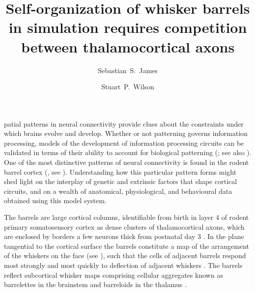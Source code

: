 \documentclass[9pt,twocolumn,twoside,lineno]{pnas-new}
\title{Self-organization of whisker barrels in simulation requires competition between thalamocortical axons}
\author[a,1]{Sebastian~S.~James}
\author[a]{Stuart~P.~Wilson}
\affil[a]{Department of Psychology, The University of Sheffield, Sheffield, United Kingdom.}
\begin{document}
\newcommand{\cmnt}[1]{\textcolor{blue}{#1}}
\newcommand{\dvrg}{\nabla\vcdot\nabla}
\newcommand{\e}{\emph}
\newcommand{\bol}{\textbf}
\newcommand{\mb}[1]{\mathbf{#1}}
\makeatletter
\newcommand*\vcdot{\mathpalette\vcdot@{.35}}
\newcommand*\vcdot@[2]{\mathbin{\vcenter{\hbox{\scalebox{#2}{$\m@th#1\bullet$}}}}}
\makeatother

\maketitle
\thispagestyle{firststyle}

\modulolinenumbers{}
\linenumbers

patial patterns in neural connectivity provide clues about
the constraints under which brains evolve and develop. Whether or not
patterning governs information processing, models of the development
of information processing circuits can be validated in terms of their
ability to account for biological patterning
(\citealp{purves_iterated_1992}; see also
\citealp{wilson_what_2015,bednar_cortical_2016}). One of the most
distinctive patterns of neural connectivity is found in the rodent
barrel cortex
(\citealp{woolsey_pattern_1948,woolsey_structural_1970,welker_structure_1974},
see \citealp{fox_barrel_2008}). Understanding how this particular
pattern forms might shed light on the interplay of genetic and
extrinsic factors that shape cortical circuits, and on a wealth of
anatomical, physiological, and behavioural data obtained using this
model system.

The barrels are large cortical columns, identifiable from birth in layer 4 of
rodent primary somatosensory cortex as dense clusters of thalamocortical
axons, which are enclosed by borders a few neurons thick from postnatal day 3
\citep{erzurumlu_development_2012}. In the plane tangential to the cortical surface the
barrels constitute a map of the arrangement of the whiskers on the
face (see \citealp{yamakado_subdivision_1979}), such
that the cells of adjacent barrels respond most strongly and most quickly to
deflection of adjacent whiskers \citep{armstrong-james_flow_1992}. The barrels
reflect subcortical whisker maps comprising cellular aggregates known as
barrelettes in the brainstem and barreloids in the thalamus
\citep{killackey_pattern_1980}.
\end{document}
